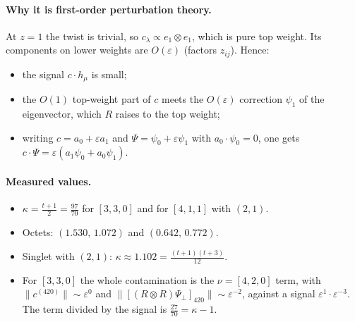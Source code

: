 \documentclass[11pt]{article}
\newcommand{\eps}{\varepsilon}
\begin{document}
\paragraph{Why it is first-order perturbation theory.} At $z=1$ the twist is trivial, so $c_\lambda\propto e_1\otimes e_1$, which is pure top weight. Its components on lower weights are $O(\eps)$ (factors $z_{ij}$). Hence:
\begin{itemize}
\item the signal $c\cdot h_\mu$ is small;
\item the $O(1)$ top-weight part of $c$ meets the $O(\eps)$ correction $\psi_1$ of the eigenvector, which $R$ raises to the top weight;
\item writing $c=a_0+\eps a_1$ and $\Psi=\psi_0+\eps\psi_1$ with $a_0\cdot\psi_0=0$, one gets $c\cdot\Psi=\eps(a_1\psi_0+a_0\psi_1)$.
\end{itemize}

\paragraph{Measured values.}
\begin{itemize}
\item $\kappa=\tfrac{t+1}{2}=\tfrac{97}{70}$ for $[3,3,0]$ and for $[4,1,1]$ with $(2,1)$.
\item Octets: $(1.530,\,1.072)$ and $(0.642,\,0.772)$.
\item Singlet with $(2,1)$: $\kappa\approx1.102=\tfrac{(t+1)(t+3)}{12}$.
\item For $[3,3,0]$ the whole contamination is the $\nu=[4,2,0]$ term, with $\|c^{(420)}\|\sim\eps^0$ and $\|[(R\otimes R)\Psi_\perp]_{420}\|\sim\eps^{-2}$, against a signal $\eps^1\cdot\eps^{-3}$. The term divided by the signal is $\tfrac{27}{70}=\kappa-1$.
\end{itemize}
\end{document}

